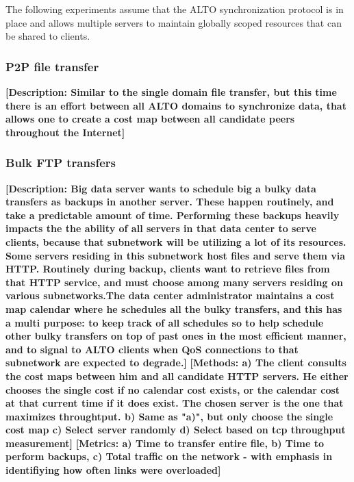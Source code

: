     The following experiments assume that the ALTO synchronization protocol is in place and allows multiple servers to maintain globally scoped resources that can be shared to clients.

\subsubsection{P2P file transfer}
\textbf{[Description: Similar to the single domain file transfer, but this time there is an effort between all ALTO domains to synchronize data, that allows one to create a cost map between all candidate peers throughout the Internet]}

\subsubsection{Bulk FTP transfers}
\textbf{[Description: Big data server wants to schedule big a bulky data transfers as backups in another server. These happen routinely, and take a predictable amount of time. Performing these backups heavily impacts the the ability of all servers in that data center to serve clients, because that subnetwork will be utilizing a lot of its resources. Some servers residing in this subnetwork host files and serve them via HTTP. Routinely during backup, clients want to retrieve files from that HTTP service, and must choose among many servers residing on various subnetworks.The data center administrator maintains a cost map calendar where he schedules all the bulky transfers, and this has a multi purpose: to keep track of all schedules so to help schedule other bulky transfers on top of past ones in the most efficient manner, and to signal to ALTO clients when QoS connections to that subnetwork are expected to degrade.]}
\textbf{[Methods: a) The client consults the cost maps between him and all candidate HTTP servers. He either chooses the single cost if no calendar cost exists, or the calendar cost at that current time if it does exist. The chosen server is the one that maximizes throughtput. b) Same as "a)", but only choose the single cost map c) Select server randomly d) Select based on tcp throughput measurement]}
\textbf{[Metrics: a) Time to transfer entire file, b) Time to perform backups, c) Total traffic on the network - with emphasis in identifiying how often links were overloaded]}

